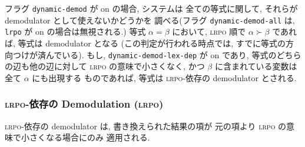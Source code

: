 フラグ \texttt{dynamic-demod} が on の場合, 
システムは
全ての等式に関して, それらが demodulator として使えないかどうかを
調べる(フラグ \texttt{dynamic-demod-all} は, \texttt{lrpo} が
on の場合は無視される.)
等式 $\alpha=\beta$ において,
\textsc{lrpo} 順で $\alpha\succ\beta$ であれば,
等式は demodulator となる
(この判定が行われる時点では, すでに等式の方向つけが済んでいる). 
もし, \texttt{dynamic-demod-lex-dep} が on であり, 
等式のどちらの辺も他の辺に対して \textsc{lrpo} の意味で小さくなく,
かつ $\beta$ に含まれている変数は全て $\alpha$ にも出現する
ものであれば, 等式は \textsc{lrpo}-依存の demodulator とされる.

\subsubsection{\textsc{lrpo}-依存の Demodulation (\textsc{lrpo})} 
\label{sec:lex-dep-lrpo}

\textsc{lrpo}-依存の demodulator は, 書き換えられた結果の項が
元の項より \textsc{lrpo} の意味で小さくなる場合にのみ
適用される.



